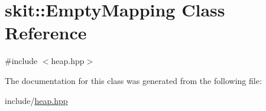 \hypertarget{classskit_1_1EmptyMapping}{}\section{skit\+:\+:Empty\+Mapping Class Reference}
\label{classskit_1_1EmptyMapping}


{\ttfamily \#include $<$heap.\+hpp$>$}



The documentation for this class was generated from the following file\+:\begin{DoxyCompactItemize}
\item 
include/\hyperlink{heap_8hpp}{heap.\+hpp}\end{DoxyCompactItemize}
